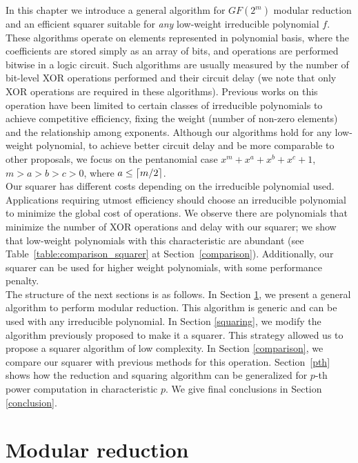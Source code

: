 In this chapter we introduce a general algorithm for $GF(2^m)$ modular reduction and an efficient squarer suitable for \emph{any} low-weight irreducible polynomial $f$. These algorithms operate on elements represented in polynomial basis, where the coefficients are stored simply as an array of bits, and operations are performed bitwise in a logic circuit. Such algorithms are usually measured by the number of bit-level XOR operations performed and their circuit delay (we note that only XOR operations are required in these algorithms). Previous works on this operation have been limited to certain classes of irreducible polynomials to achieve competitive efficiency, fixing the weight (number of non-zero elements) and the relationship among exponents. 
Although our algorithms hold for any low-weight polynomial, to achieve better circuit delay and be more comparable to other proposals, we focus on the pentanomial case $x^m+x^a+x^b+x^c+1$, $m > a > b > c > 0$, where $a \leq \lceil m/2\rceil$.\\

Our squarer has different costs depending on the irreducible polynomial used. Applications requiring utmost efficiency should choose an irreducible polynomial to minimize the global cost of operations. We observe there are polynomials that minimize the number of XOR operations and delay with our squarer; we show that low-weight polynomials with this characteristic are abundant (see Table~\ref{table:comparison_squarer} at Section~\ref{comparison}). Additionally, our squarer can be used for higher weight polynomials, with some performance penalty.\\

The structure of the next sections is as follows. In Section \ref{modrec}, we present a general algorithm to perform modular reduction. This algorithm is generic and can be used with any irreducible polynomial. In Section \ref{squaring}, we modify the algorithm previously proposed to make it a squarer. This strategy allowed us to propose a squarer algorithm of low complexity. In Section \ref{comparison}, we compare our squarer with previous methods for this operation. Section~\ref{pth} shows how the reduction and squaring algorithm can be generalized for $p$-th power computation in characteristic $p$. We give final conclusions in Section \ref{conclusion}.

\section{Modular reduction} \label{modrec}

